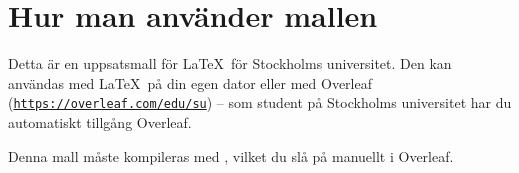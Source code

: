 
\section{Hur man använder mallen}
\label{anvandning}

Detta är en uppsatsmall för \LaTeX\ för Stockholms universitet. Den kan
användas med \LaTeX\ på din egen dator eller med Overleaf
(\texttt{\href{https://overleaf.com/edu/su}{https://\linebreak[0]{}overleaf\linebreak[0]{}.com/\linebreak[0]{}edu/\linebreak[0]{}su}})
-- som student på Stockholms universitet har du automatiskt tillgång Overleaf.

Denna mall måste kompileras med \XeLaTeX, vilket du slå på manuellt i Overleaf.

